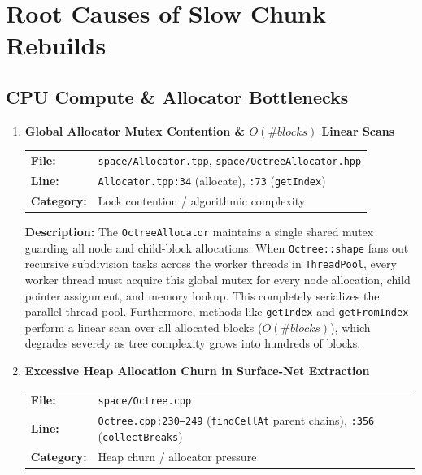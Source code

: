 \documentclass[a4paper,12pt]{article}
\newcommand{\severitybox}[2]{%
  \colorbox{#1}{\makebox[2.5cm][c]{\textcolor{white}{\textbf{#2}}}}%
}
\begin{document}
\newpage

\section{Root Causes of Slow Chunk Rebuilds}

\subsection{CPU Compute \& Allocator Bottlenecks}

\begin{enumerate}[leftmargin=*]

\item[\textbf{[CR1]}] \textbf{Global Allocator Mutex Contention \& $O(\#blocks)$ Linear Scans}
  \hfill \severitybox{highcolor}{HIGH}

  \begin{tabular}{ll}
    \textbf{File:} & \texttt{space/Allocator.tpp}, \texttt{space/OctreeAllocator.hpp} \\
    \textbf{Line:} & \texttt{Allocator.tpp:34} (allocate), \texttt{:73} (\texttt{getIndex}) \\
    \textbf{Category:} & Lock contention / algorithmic complexity \\
  \end{tabular}

  \textbf{Description:}
  The \texttt{OctreeAllocator} maintains a single shared mutex guarding all node and child-block allocations. When \texttt{Octree::shape} fans out recursive subdivision tasks across the worker threads in \texttt{ThreadPool}, every worker thread must acquire this global mutex for every node allocation, child pointer assignment, and memory lookup. This completely serializes the parallel thread pool. Furthermore, methods like \texttt{getIndex} and \texttt{getFromIndex} perform a linear scan over all allocated blocks ($O(\#blocks)$), which degrades severely as tree complexity grows into hundreds of blocks.

\item[\textbf{[CR2]}] \textbf{Excessive Heap Allocation Churn in Surface-Net Extraction}
  \hfill \severitybox{highcolor}{HIGH}

  \begin{tabular}{ll}
    \textbf{File:} & \texttt{space/Octree.cpp} \\
    \textbf{Line:} & \texttt{Octree.cpp:230--249} (\texttt{findCellAt} parent chains), \texttt{:356} (\texttt{collectBreaks}) \\
    \textbf{Category:} & Heap churn / allocator pressure \\
  \end{tabular}


\end{enumerate}
\end{document}
